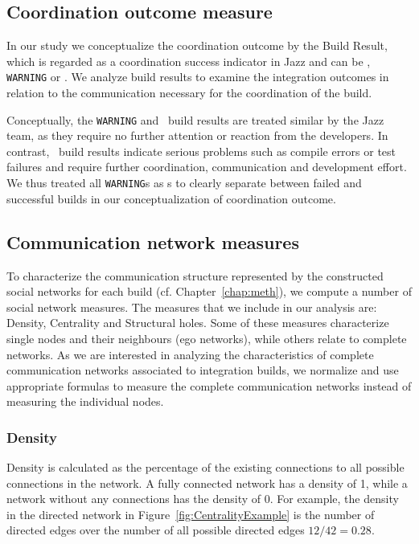 \subsection{Coordination outcome measure}
In our study we conceptualize the coordination outcome by the Build Result,
which is regarded as a coordination success indicator in Jazz and can be \error,
\texttt{WARNING} or \ok. We analyze build results to examine the integration
outcomes in relation to the communication necessary for the coordination of the
build.

Conceptually, the \texttt{WARNING} and \ok\ build results are treated similar by
the Jazz team, as they require no further attention or reaction from the
developers. In contrast, \error\ build results indicate serious problems such as
compile errors or test failures and require further coordination, communication
and development effort. We thus treated all \texttt{WARNING}s as \ok s to clearly
separate between failed and successful builds in our conceptualization of
coordination outcome.


\subsection{Communication network measures}
To characterize the communication structure represented by the constructed social
networks for each build (cf. Chapter~\ref{chap:meth}), we compute a number of social network measures. The
measures that we include in our analysis are: Density, Centrality and Structural
holes. Some of these measures characterize single nodes and their neighbours (ego
networks), while others relate to complete networks. As we are interested in
analyzing the characteristics of complete communication networks associated to
integration builds, we normalize and use appropriate formulas to measure the
complete communication networks instead of measuring the individual nodes.

\subsubsection{Density}
Density is calculated as the percentage of the existing connections to all
possible connections in the network. A fully connected network has a density of
1, while a network without any connections has the density of 0. For example, the
density in the directed network in Figure~\ref{fig:CentralityExample} is
the number of directed edges over the number of all possible directed edges $12/42=0.28$.



